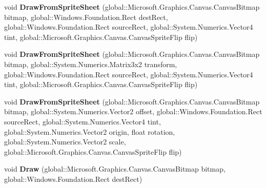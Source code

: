 \begin{DoxyCompactItemize}
\item 
\mbox{\label{interface_microsoft_1_1_graphics_1_1_canvas_1_1_i_canvas_sprite_batch_ad293d5fbb3ed75a7349a5af546ee5a77}} 
void {\bfseries Draw\+From\+Sprite\+Sheet} (global\+::\+Microsoft.\+Graphics.\+Canvas.\+Canvas\+Bitmap bitmap, global\+::\+Windows.\+Foundation.\+Rect dest\+Rect, global\+::\+Windows.\+Foundation.\+Rect source\+Rect, global\+::\+System.\+Numerics.\+Vector4 tint, global\+::\+Microsoft.\+Graphics.\+Canvas.\+Canvas\+Sprite\+Flip flip)
\item 
\mbox{\label{interface_microsoft_1_1_graphics_1_1_canvas_1_1_i_canvas_sprite_batch_a16ce9e3d6fcd3a35b2ca5ddc20b167fa}} 
void {\bfseries Draw\+From\+Sprite\+Sheet} (global\+::\+Microsoft.\+Graphics.\+Canvas.\+Canvas\+Bitmap bitmap, global\+::\+System.\+Numerics.\+Matrix3x2 transform, global\+::\+Windows.\+Foundation.\+Rect source\+Rect, global\+::\+System.\+Numerics.\+Vector4 tint, global\+::\+Microsoft.\+Graphics.\+Canvas.\+Canvas\+Sprite\+Flip flip)
\item 
\mbox{\label{interface_microsoft_1_1_graphics_1_1_canvas_1_1_i_canvas_sprite_batch_ac11b7ca2c7e66d7f79048004f3a75b53}} 
void {\bfseries Draw\+From\+Sprite\+Sheet} (global\+::\+Microsoft.\+Graphics.\+Canvas.\+Canvas\+Bitmap bitmap, global\+::\+System.\+Numerics.\+Vector2 offset, global\+::\+Windows.\+Foundation.\+Rect source\+Rect, global\+::\+System.\+Numerics.\+Vector4 tint, global\+::\+System.\+Numerics.\+Vector2 origin, float rotation, global\+::\+System.\+Numerics.\+Vector2 scale, global\+::\+Microsoft.\+Graphics.\+Canvas.\+Canvas\+Sprite\+Flip flip)
\item 
\mbox{\label{interface_microsoft_1_1_graphics_1_1_canvas_1_1_i_canvas_sprite_batch_a523bb7703d792520261dec0792f80b61}} 
void {\bfseries Draw} (global\+::\+Microsoft.\+Graphics.\+Canvas.\+Canvas\+Bitmap bitmap, global\+::\+Windows.\+Foundation.\+Rect dest\+Rect)
\item 
\mbox{\label{interface_microsoft_1_1_graphics_1_1_canvas_1_1_i_canvas_sprite_batch_a772228b4cde10ff970a8e93625163bd8}} 

\end{DoxyCompactItemize}
